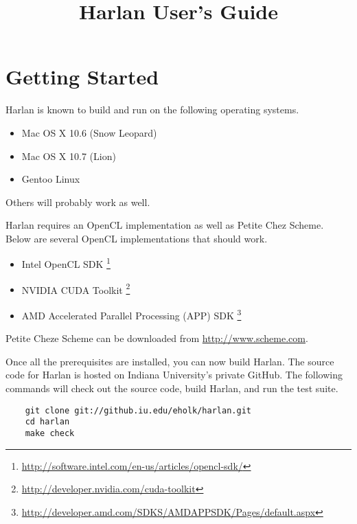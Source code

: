 \documentclass{book}
\begin{document}

\title{Harlan User's Guide}

\maketitle

\tableofcontents

\chapter{Getting Started}

Harlan is known to build and run on the following operating systems.
\begin{itemize}
\item Mac OS X 10.6 (Snow Leopard)
\item Mac OS X 10.7 (Lion)
\item Gentoo Linux
\end{itemize}

Others will probably work as well.

Harlan requires an OpenCL implementation as well as Petite Chez
Scheme. Below are several OpenCL implementations that should work.

\begin{itemize}
\item Intel OpenCL SDK
  \footnote{\url{http://software.intel.com/en-us/articles/opencl-sdk/}}
\item NVIDIA CUDA Toolkit
  \footnote{\url{http://developer.nvidia.com/cuda-toolkit}}
\item AMD Accelerated Parallel Processing (APP) SDK
  \footnote{\url{http://developer.amd.com/SDKS/AMDAPPSDK/Pages/default.aspx}}
\end{itemize}

Petite Cheze Scheme can be downloaded from
\url{http://www.scheme.com}.

Once all the prerequisites are installed, you can now build
Harlan. The source code for Harlan is hosted on Indiana University's
private GitHub. The following commands will check out the source code,
build Harlan, and run the test suite.

\begin{verbatim}
    git clone git://github.iu.edu/eholk/harlan.git
    cd harlan
    make check
\end{verbatim}
\end{document}
